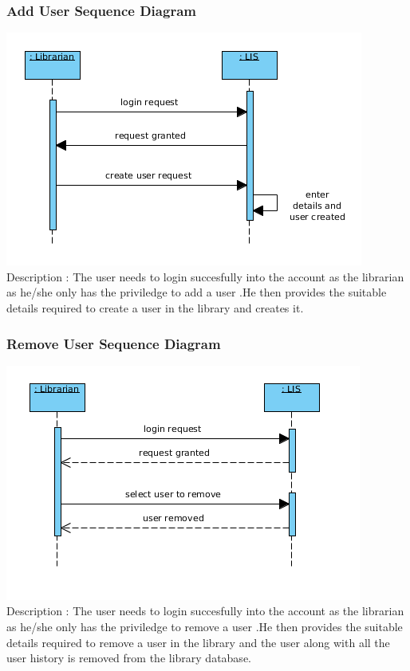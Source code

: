 \documentclass[a4paper]{article}
\begin{document}
\subsubsection*{Add User Sequence Diagram}
\includegraphics[scale=0.50]{images/seqDiagAddUser.png}
\\
Description : The user needs to login succesfully into the account as the librarian as he/she only has the priviledge to add a user .He then provides the suitable details required to create a user in the library and creates it.
\\

\subsubsection*{Remove User Sequence Diagram}
\includegraphics[scale=0.50]{images/seqDiagRemoveUser.png}
\\
Description : The user needs to login succesfully into the account as the librarian as he/she only has the priviledge to remove a user .He then provides the suitable details required to remove a user in the library and the user along with all the user history is removed from the library database.
\\
\end{document}
